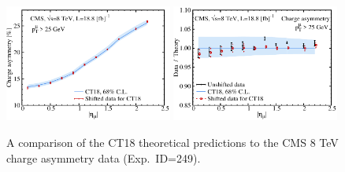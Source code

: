 \begin{figure}[t]
	\includegraphics[width=0.49\textwidth]{./fig/data_249_CT18_abs_ect.pdf}
	\includegraphics[width=0.49\textwidth]{./fig/data_249_CT18_DoT_ect.pdf}
	\caption{A comparison of the CT18 theoretical predictions to the CMS 8 TeV charge asymmetry data (Exp.~ID=249).}
\label{fig:id249}
\end{figure}




